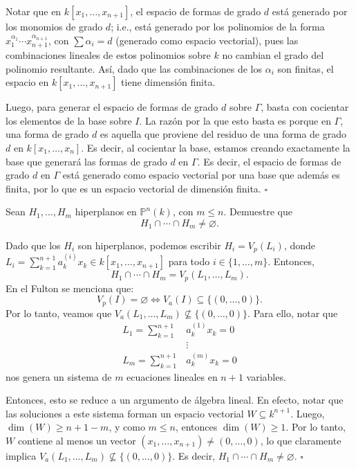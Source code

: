 \documentclass[12pt]{amsart}
\newenvironment{ejercicio}[1]{%
  \begin{trivlist}\item[\hskip\labelsep\textbf{Ejercicio #1.}]\itshape%
}{\end{trivlist}}
\newenvironment{dem}{%
  \begin{trivlist}\item[\hskip\labelsep\textit{Demostración:}]%
}{\hfill$\square$\end{trivlist}}
\begin{document}
\begin{dem}
Notar que en $k[x_1, \ldots, x_{n+1}]$, el espacio de formas de grado $d$ está generado por los monomios de grado $d$; i.e., está generado por los polinomios de la forma $x_1^{\alpha_1} \cdots x_{n+1}^{\alpha_{n+1}}$, con $\sum \alpha_i = d$ (generado como espacio vectorial), pues las combinaciones lineales de estos polinomios sobre $k$ no cambian el grado del polinomio resultante. Así, dado que las combinaciones de los $\alpha_i$ son finitas, el espacio en $k[x_1, \ldots, x_{n+1}]$ tiene dimensión finita. \par
Luego, para generar el espacio de formas de grado $d$ sobre $\Gamma$, basta con cocientar los elementos de la base sobre $I$. La razón por la que esto basta es porque en $\Gamma$, una forma de grado $d$ es aquella que proviene del residuo de una forma de grado $d$ en $k[x_1, \ldots, x_n]$. Es decir, al cocientar la base, estamos creando exactamente la base que generará las formas de grado $d$ en $\Gamma$. Es decir, el espacio de formas de grado $d$ en $\Gamma$ está generado como espacio vectorial por una base que además es finita, por lo que es un espacio vectorial de dimensión finita.
\end{dem}

\medskip
\begin{ejercicio}{4.12}
Sean $H_1, \ldots, H_m$ hiperplanos en $\mathbb{P}^n(k)$, con $m \leq n$. Demuestre que
\[
  H_1 \cap \cdots \cap H_m \neq \varnothing.
\]
\end{ejercicio}

\begin{dem}
Dado que los $H_i$ son hiperplanos, podemos escribir $H_i = V_p(L_i)$, donde $L_i = \sum_{k=1}^{n+1} a_k^{(i)} x_k \in k[x_1, \ldots, x_{n+1}]$ para todo $i \in \{1, \ldots, m\}$. Entonces,
\[
  H_1 \cap \cdots \cap H_m = V_p(L_1, \ldots, L_m).
\]
En el Fulton se menciona que:
\[
  V_p(I) = \varnothing \iff V_a(I) \subseteq \{(0, \ldots, 0)\}.
\]
Por lo tanto, veamos que $V_a(L_1, \ldots, L_m) \not\subseteq \{(0, \ldots, 0)\}$. Para ello, notar que
\begin{align*}
	L_1 = \sum_{k=1}^{n+1} & a_k^{(1)} x_k = 0 \\
	&\vdots \\
	L_m = \sum_{k=1}^{n+1} & a_k^{(m)} x_k = 0
\end{align*}
nos genera un sistema de $m$ ecuaciones lineales en $n+1$ variables. \par
Entonces, esto se reduce a un argumento de álgebra lineal. En efecto, notar que las soluciones a este sistema forman un espacio vectorial $W \subseteq k^{n+1}$. Luego, $\dim(W) \geq n+1-m$, y como $m \leq n$, entonces $\dim(W) \geq 1$. Por lo tanto, $W$ contiene al menos un vector $(x_1, \ldots, x_{n+1}) \neq (0, \ldots, 0)$, lo que claramente implica $V_a(L_1, \ldots, L_m) \not\subseteq \{(0, \ldots, 0)\}$. Es decir, $H_1 \cap \cdots \cap H_m \neq \varnothing$.
\end{dem}
\end{document}
